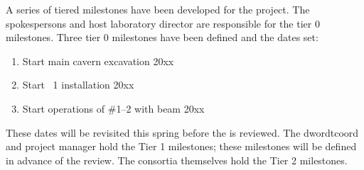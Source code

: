 A series of tiered milestones have been developed for the 
project. The spokespersons and host laboratory director are
responsible for the tier 0 milestones. Three tier 0 milestones have
been defined and the dates set:
\begin{enumerate}
\item Start main cavern excavation \hspace{2.58in} 20xx
\item Start ~1 installation \hspace{2.1in} 20xx
\item Start operations of  \#1--2 with beam \hspace{0.8in} 20xx
\end{enumerate}
These dates will be revisited this spring before the  is reviewed. The
dword{tcoord} and  project manager hold the Tier 1
milestones; these milestones will be defined in advance of the
 review. The consortia themselves hold the Tier 2
milestones.


